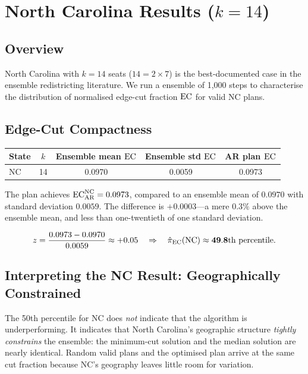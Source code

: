 \section{North Carolina Results ($k = 14$)}
\label{sec:nc}

\subsection{Overview}

North Carolina with $k = 14$ seats ($14 = 2 \times 7$) is the best-documented
case in the ensemble redistricting literature.  We run a \gc{} \recom{}
ensemble of 1,000 steps to characterise the distribution of normalised
edge-cut fraction $\mathrm{EC}$ for valid NC plans.

\subsection{Edge-Cut Compactness}

\begin{center}
\begin{tabular}{lcccc}
\toprule
State & $k$ & Ensemble mean $\mathrm{EC}$ & Ensemble std $\mathrm{EC}$ & AR plan $\mathrm{EC}$ \\
\midrule
NC & 14 & 0.0970 & 0.0059 & 0.0973 \\
\bottomrule
\end{tabular}
\end{center}

The \ar{} plan achieves $\mathrm{EC}_{\mathrm{AR}}^{\mathrm{NC}} = 0.0973$, compared
to an ensemble mean of $0.0970$ with standard deviation $0.0059$.  The
difference is $+0.0003$---a mere $0.3\%$ above the ensemble mean, and less
than one-twentieth of one standard deviation.

\begin{equation}
  z = \frac{0.0973 - 0.0970}{0.0059} \approx +0.05 \quad\Rightarrow\quad
  \hat\pi_{\mathrm{EC}}(\mathrm{NC}) \approx \mathbf{49.8\text{th percentile}}.
\end{equation}

\subsection{Interpreting the NC Result: Geographically Constrained}

The 50th percentile for NC does \emph{not} indicate that the \ar{} algorithm
is underperforming.  It indicates that North Carolina's geographic structure
\emph{tightly constrains} the ensemble: the minimum-cut solution and the
median solution are nearly identical.  Random valid plans and the optimised
plan arrive at the same cut fraction because NC's geography leaves little
room for variation.

